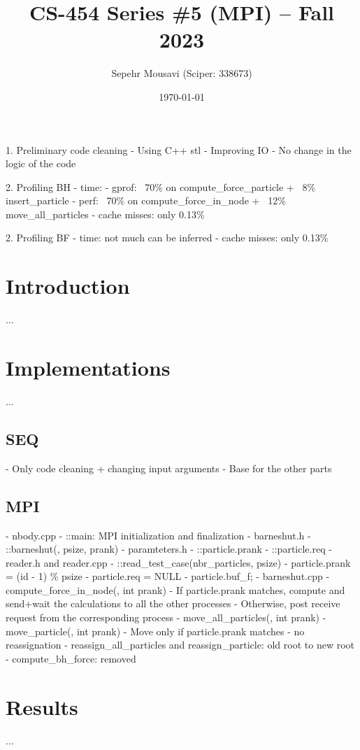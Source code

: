 \documentclass[10pt,journal,compsocconf]{IEEEtran}
\title{CS-454 Series \#5 (MPI) -- Fall 2023}
\author{
  Sepehr Mousavi (Sciper: 338673)
}
\date{\today}
\begin{document}
\maketitle


1. Preliminary code cleaning
  - Using C++ stl
  - Improving IO
  - No change in the logic of the code

2. Profiling BH
  - time:
    - gprof: ~70\% on compute_force_particle + ~8\% insert_particle
    - perf: ~70\% on compute_force_in_node + ~12\% move_all_particles
  - cache misses: only 0.13\%
    
2. Profiling BF
  - time: not much can be inferred
  - cache misses: only 0.13\%


\section{Introduction}
...

\section{Implementations}
...

\subsection{SEQ}
- Only code cleaning + changing input arguments
- Base for the other parts

\subsection{MPI}
- nbody.cpp
  - ::main: MPI initialization and finalization
- barneshut.h
  - ::barneshut(, psize, prank)
- paramteters.h
  - ::particle.prank
  - ::particle.req
- reader.h and reader.cpp
  - ::read_test_case(nbr_particles, psize)
  - particle.prank = (id - 1) \% psize
  - particle.req = NULL
  - particle.buf_f;
- barneshut.cpp
  - compute_force_in_node(, int prank)
    - If particle.prank matches, compute and send+wait the calculations to all the other processes
    - Otherwise, post receive request from the corresponding process
  - move_all_particles(, int prank)
  - move_particle(, int prank)
      - Move only if particle.prank matches
      - no reassignation
  - reassign_all_particles and reassign_particle: old root to new root
  - compute_bh_force: removed

\section{Results}
...
\end{document}
